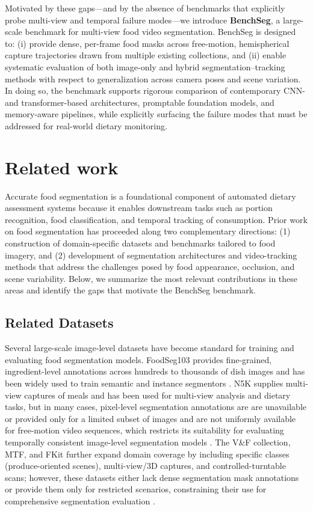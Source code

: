 \documentclass[preprint,12pt]{elsarticle}
\begin{document}
Motivated by these gaps—and by the absence of benchmarks that explicitly probe multi-view and temporal failure modes—we introduce \textbf{BenchSeg}, a large-scale benchmark for multi-view food video segmentation. BenchSeg is designed to: (i) provide dense, per-frame food masks across free-motion, hemispherical capture trajectories drawn from multiple existing collections, and (ii) enable systematic evaluation of both image-only and hybrid segmentation–tracking methods with respect to generalization across camera poses and scene variation. In doing so, the benchmark supports rigorous comparison of contemporary CNN- and transformer-based architectures, promptable foundation models, and memory-aware pipelines, while explicitly surfacing the failure modes that must be addressed for real-world dietary monitoring.


\section{Related work}
\label{sec:related_work}
Accurate food segmentation is a foundational component of automated dietary assessment systems because it enables downstream tasks such as portion recognition, food classification, and temporal tracking of consumption. Prior work on food segmentation has proceeded along two complementary directions: (1) construction of domain-specific datasets and benchmarks tailored to food imagery, and (2) development of segmentation architectures and video-tracking methods that address the challenges posed by food appearance, occlusion, and scene variability. Below, we summarize the most relevant contributions in these areas and identify the gaps that motivate the BenchSeg benchmark.

\subsection{Related Datasets}
Several large-scale image-level datasets have become standard for training and evaluating food segmentation models. FoodSeg103 provides fine-grained, ingredient-level annotations across hundreds to thousands of dish images and has been widely used to train semantic and instance segmentors \cite{wu2021large}. N5K supplies multi-view captures of meals and has been used for multi-view analysis and dietary tasks, but in many cases, pixel-level segmentation annotations are are unavailable or provided only for a limited subset of images and are not uniformly available for free-motion video sequences, which restricts its suitability for evaluating temporally consistent image-level segmentation models \cite{thames2021nutrition5k}. The V\&F collection, MTF, and FKit further expand domain coverage by including specific classes (produce-oriented scenes), multi-view/3D captures, and controlled-turntable scans; however, these datasets either lack dense segmentation mask annotations or provide them only for restricted scenarios, constraining their use for comprehensive segmentation evaluation \cite{steinbrener2023learning,chen2024metafood3d,haroon2025vole}.
\end{document}
